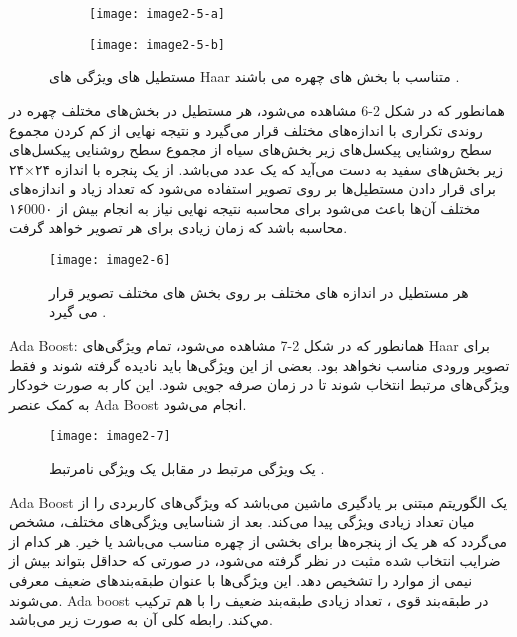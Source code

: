 \begin{figure}
\begin{subfigure}{.5\textwidth}
  \centering
  \texttt{[image: image2-5-a]}
  \label{image2-5-a}
\end{subfigure}
\begin{subfigure}{.5\textwidth}
  \centering
  \texttt{[image: image2-5-b]}
  \label{image2-5-b}
\end{subfigure}
\caption{مستطیل های ویژگی های Haar متناسب با بخش های چهره می باشند \cite{ref1}.}
\label{fig:image2-5}
\end{figure}

همانطور که در شکل 2-6 مشاهده می‌شود، هر مستطیل در بخش‌های مختلف چهره در روندی تکراری با اندازه‌های مختلف قرار می‌گیرد و نتیجه نهایی از کم کردن مجموع سطح روشنایی پیکسل‌های زیر بخش‌های سیاه از مجموع سطح روشنایی پیکسل‌های زیر بخش‌های سفید به دست می‌آید که یک عدد می‌باشد. از یک پنجره با اندازه ۲۴×۲۴ برای قرار دادن مستطیل‌ها بر روی تصویر استفاده می‌شود که تعداد زیاد و اندازه‌های مختلف آن‌ها باعث می‌شود برای محاسبه نتیجه نهایی نیاز به انجام بیش از ۱۶000۰ محاسبه باشد که زمان زیادی برای هر تصویر خواهد گرفت.

\begin{figure}[h]
\centering
  \texttt{[image: image2-6]}
  \caption{هر مستطیل در اندازه های مختلف بر روی بخش های مختلف تصویر قرار می گیرد \cite{ref1}.}
  \label{image2-6}
\end{figure}

Ada Boost: 
همانطور که در شکل 2-7 مشاهده می‌شود، تمام ویژگی‌های Haar برای تصویر ورودی مناسب نخواهد بود. بعضی از این ویژگی‌ها باید نادیده گرفته شوند و فقط ویژگی‌های مرتبط انتخاب شوند تا در زمان صرفه جویی شود. این کار به صورت خودکار به کمک عنصر Ada Boost انجام می‌شود.
\begin{figure}[h]
\centering
  \texttt{[image: image2-7]}
  \caption{یک ویژگی مرتبط در مقابل یک ویژگی نامرتبط \cite{ref1}.}
  \label{image2-7}
\end{figure}

Ada Boost 
یک الگوریتم مبتنی بر یادگیری ماشین می‌باشد که ویژگی‌های کاربردی را از میان تعداد زیادی ویژگی پیدا می‌کند. بعد از شناسایی ویژگی‌های مختلف، مشخص می‌گردد که هر یک از پنجره‌ها برای بخشی از چهره مناسب می‌باشد یا خیر. هر کدام از ضرایب انتخاب شده مثبت در نظر گرفته می‌شود، در صورتی که حداقل بتواند بیش از نیمی از موارد را تشخیص دهد. این ویژگی‌ها با عنوان طبقه‌بندهای ضعیف  معرفی می‌شوند. Ada boost در طبقه‌بند قوی ، تعداد زيادی طبقه‌بند ضعيف را با هم ترکيب مي‌کند. رابطه کلی آن به صورت زیر می‌باشد.

